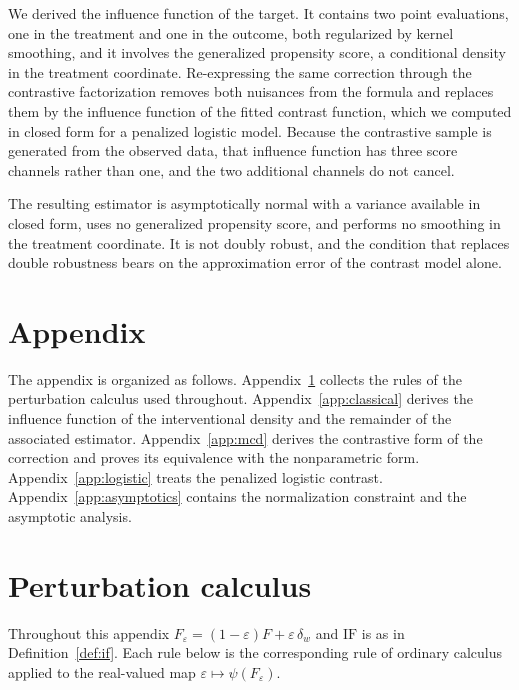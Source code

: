 \documentclass[11pt]{article}
\theoremstyle{plain}
\theoremstyle{definition}
\theoremstyle{remark}
\newcommand{\IF}{\mathrm{IF}}
\begin{document}
We derived the influence function of the target. It contains two point evaluations, one
in the treatment and one in the outcome, both regularized by kernel smoothing, and it
involves the generalized propensity score, a conditional density in the treatment
coordinate. Re-expressing the same correction through the contrastive factorization
removes both nuisances from the formula and replaces them by the influence function of
the fitted contrast function, which we computed in closed form for a penalized logistic
model. Because the contrastive sample is generated from the observed data, that influence
function has three score channels rather than one, and the two additional channels do not
cancel.

The resulting estimator is asymptotically normal with a variance available in closed
form, uses no generalized propensity score, and performs no smoothing in the treatment
coordinate. It is not doubly robust, and the condition that replaces double robustness
bears on the approximation error of the contrast model alone.




\clearpage
\appendix

\section*{Appendix}

The appendix is organized as follows. Appendix~\ref{app:toolbox} collects the rules of
the perturbation calculus used throughout. Appendix~\ref{app:classical} derives the
influence function of the interventional density and the remainder of the associated
estimator. Appendix~\ref{app:mcd} derives the contrastive form of the correction and
proves its equivalence with the nonparametric form. Appendix~\ref{app:logistic} treats
the penalized logistic contrast. Appendix~\ref{app:asymptotics} contains the
normalization constraint and the asymptotic analysis.

\section{Perturbation calculus}
\label{app:toolbox}

Throughout this appendix $F_\varepsilon = (1-\varepsilon)F + \varepsilon\,\delta_w$ and
$\IF$ is as in Definition~\ref{def:if}. Each rule below is the corresponding rule of
ordinary calculus applied to the real-valued map
$\varepsilon \mapsto \psi(F_\varepsilon)$.
\end{document}
